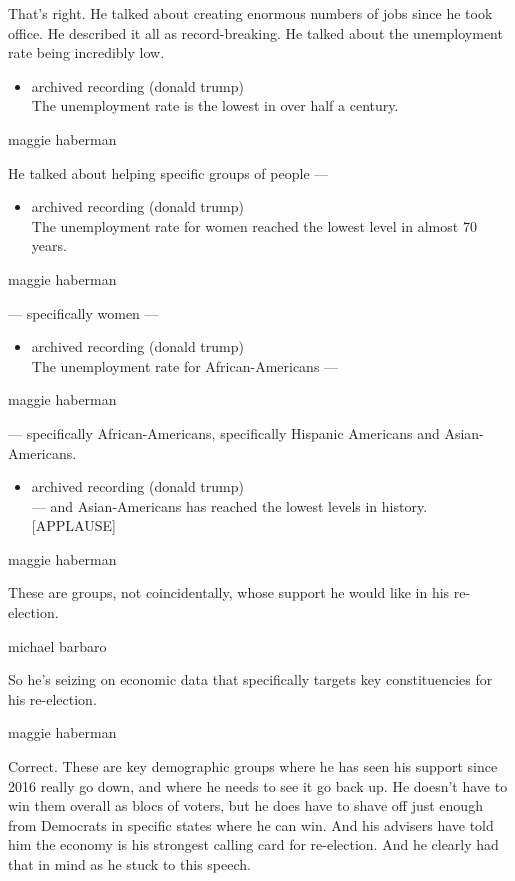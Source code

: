 That's right. He talked about creating enormous numbers of jobs since he
took office. He described it all as record-breaking. He talked about the
unemployment rate being incredibly low.

\begin{itemize}
\tightlist
\item
  archived recording (donald trump)\\
  The unemployment rate is the lowest in over half a century.
\end{itemize}

maggie haberman

He talked about helping specific groups of people ---

\begin{itemize}
\tightlist
\item
  archived recording (donald trump)\\
  The unemployment rate for women reached the lowest level in almost 70
  years.
\end{itemize}

maggie haberman

--- specifically women ---

\begin{itemize}
\tightlist
\item
  archived recording (donald trump)\\
  The unemployment rate for African-Americans ---
\end{itemize}

maggie haberman

--- specifically African-Americans, specifically Hispanic Americans and
Asian-Americans.

\begin{itemize}
\tightlist
\item
  archived recording (donald trump)\\
  --- and Asian-Americans has reached the lowest levels in history.
  {[}APPLAUSE{]}
\end{itemize}

maggie haberman

These are groups, not coincidentally, whose support he would like in his
re-election.

michael barbaro

So he's seizing on economic data that specifically targets key
constituencies for his re-election.

maggie haberman

Correct. These are key demographic groups where he has seen his support
since 2016 really go down, and where he needs to see it go back up. He
doesn't have to win them overall as blocs of voters, but he does have to
shave off just enough from Democrats in specific states where he can
win. And his advisers have told him the economy is his strongest calling
card for re-election. And he clearly had that in mind as he stuck to
this speech.

